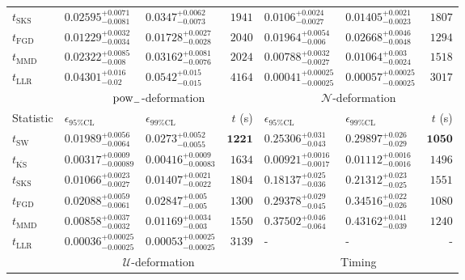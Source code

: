 \begin{tabular}{l|llr|llr}
	$t_{\mathrm{SKS}}$ & $0.02595_{-0.0081}^{+0.0071}$ & $0.0347_{-0.0073}^{+0.0062}$ & $1941$ & $0.0106_{-0.0027}^{+0.0024}$ & $0.01405_{-0.0023}^{+0.0021}$ & $1807$ \\
	$t_{\mathrm{FGD}}$ & ${\mathbf{0.01229_{-0.0034}^{+0.0032}}}$ & ${\mathbf{0.01728_{-0.0028}^{+0.0027}}}$ & $2040$ & $0.01964_{-0.006}^{+0.0054}$ & $0.02668_{-0.0048}^{+0.0046}$ & $1294$ \\
	$t_{\mathrm{MMD}}$ & $0.02322_{-0.008}^{+0.0085}$ & $0.03162_{-0.0076}^{+0.0081}$ & $2024$ & $0.00788_{-0.0027}^{+0.0032}$ & $0.01064_{-0.0024}^{+0.003}$ & $1518$ \\
	$t_{\mathrm{LLR}}$ & $0.04301_{-0.02}^{+0.016}$ & $0.0542_{-0.015}^{+0.015}$ & $4164$ & $0.00041_{-0.00025}^{+0.00025}$ & $0.00057_{-0.00025}^{+0.00025}$ & $3017$ \\
	\toprule
	\multicolumn{1}{c}{} & \multicolumn{3}{c}{$\rm{pow}_{-}$-deformation} & \multicolumn{3}{c}{$\mathcal{N}$-deformation} \\
	Statistic & $\epsilon_{95\%\mathrm{CL}}$ & $\epsilon_{99\%\mathrm{CL}}$ & $t$ (s) & $\epsilon_{95\%\mathrm{CL}}$ & $\epsilon_{99\%\mathrm{CL}}$ & $t$ (s) \\
	\midrule
	$t_{\mathrm{SW}}$ & $0.01989_{-0.0064}^{+0.0056}$ & $0.0273_{-0.0055}^{+0.0052}$ & ${\mathbf{1221}}$ & $0.25306_{-0.043}^{+0.031}$ & $0.29897_{-0.029}^{+0.026}$ & ${\mathbf{1050}}$ \\
	$t_{\overline{\mathrm{KS}}}$ & ${\mathbf{0.00317_{-0.00089}^{+0.0009}}}$ & ${\mathbf{0.00416_{-0.00083}^{+0.0009}}}$ & $1634$ & ${\mathbf{0.00921_{-0.0017}^{+0.0016}}}$ & ${\mathbf{0.01112_{-0.0016}^{+0.0016}}}$ & $1496$ \\
	$t_{\mathrm{SKS}}$ & $0.01066_{-0.0027}^{+0.0023}$ & $0.01407_{-0.0022}^{+0.0021}$ & $1804$ & $0.18137_{-0.036}^{+0.025}$ & $0.21312_{-0.025}^{+0.023}$ & $1551$ \\
	$t_{\mathrm{FGD}}$ & $0.02088_{-0.0061}^{+0.0059}$ & $0.02847_{-0.005}^{+0.005}$ & $1300$ & $0.29378_{-0.045}^{+0.029}$ & $0.34516_{-0.026}^{+0.022}$ & $1080$ \\
	$t_{\mathrm{MMD}}$ & $0.00858_{-0.0032}^{+0.0037}$ & $0.01169_{-0.003}^{+0.0034}$ & $1550$ & $0.37502_{-0.064}^{+0.046}$ & $0.43162_{-0.039}^{+0.041}$ & $1240$ \\
	$t_{\mathrm{LLR}}$ & $0.00036_{-0.00025}^{+0.00025}$ & $0.00053_{-0.00025}^{+0.00025}$ & $3139$ & - & - & - \\
	\toprule
	\multicolumn{1}{c}{} & \multicolumn{3}{c}{$\mathcal{U}$-deformation} & \multicolumn{3}{c}{Timing} \\

\end{tabular}
